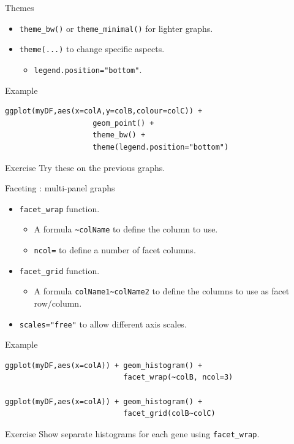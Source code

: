 \documentclass[10pt]{beamer}
\begin{document}
\begin{frame}[fragile]{Themes}
  \begin{block}{}
    \begin{itemize}
    \item \verb!theme_bw()! or \verb!theme_minimal()! for lighter graphs.
    \item \verb!theme(...)! to change specific aspects.
      \begin{itemize}
      \item \verb!legend.position="bottom"!.
      \end{itemize}
    \end{itemize}
  \end{block}
  \begin{exampleblock}{Example}
\begin{verbatim}
ggplot(myDF,aes(x=colA,y=colB,colour=colC)) + 
                    geom_point() + 
                    theme_bw() + 
                    theme(legend.position="bottom")
\end{verbatim}
  \end{exampleblock}
  \begin{alertblock}{Exercise}
    Try these on the previous graphs.
  \end{alertblock}
\end{frame}


\begin{frame}[fragile, shrink=10]{Faceting : multi-panel graphs}
  \begin{block}{}
    \begin{itemize}
    \item \verb!facet_wrap! function.
      \begin{itemize}
      \item A formula \verb!~colName! to define the column to use.
      \item \verb!ncol=! to define a number of facet columns.
      \end{itemize}
      \bigskip
    \item \verb!facet_grid! function.
      \begin{itemize}
      \item A formula \verb!colName1~colName2! to define the columns to use as facet row/column.
      \end{itemize}
      \bigskip
    \item \verb!scales="free"! to allow different axis scales.
    \end{itemize}
  \end{block}
  \begin{exampleblock}{Example}
\begin{verbatim}
ggplot(myDF,aes(x=colA)) + geom_histogram() + 
                           facet_wrap(~colB, ncol=3)

ggplot(myDF,aes(x=colA)) + geom_histogram() + 
                           facet_grid(colB~colC)
\end{verbatim}
  \end{exampleblock}
  \begin{alertblock}{Exercise}
    Show separate histograms for each gene using \verb!facet_wrap!.
  \end{alertblock}
\end{frame}
\end{document}

